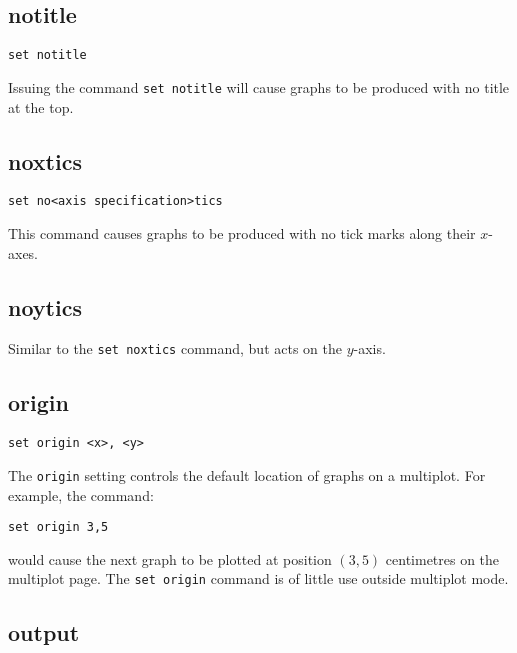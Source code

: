 \subsection{notitle}

\begin{verbatim}
set notitle
\end{verbatim}

Issuing the command {\tt set notitle} will cause graphs to be produced with no
title at the top.


\subsection{noxtics}

\begin{verbatim}
set no<axis specification>tics
\end{verbatim}

This command causes graphs to be produced with no tick marks along their $x$-axes.

\subsection{noytics}

Similar to the {\tt set noxtics} command, but acts on the $y$-axis.


\subsection{origin}

\begin{verbatim}
set origin <x>, <y>
\end{verbatim}

The {\tt origin} setting controls the default location of graphs on a multiplot.
For example, the command:

\begin{verbatim}
set origin 3,5
\end{verbatim}

\noindent would cause the next graph to be plotted at position $(3,5)$ centimetres on the
multiplot page. The {\tt set origin} command is of little use outside multiplot
mode.


\subsection{output}

